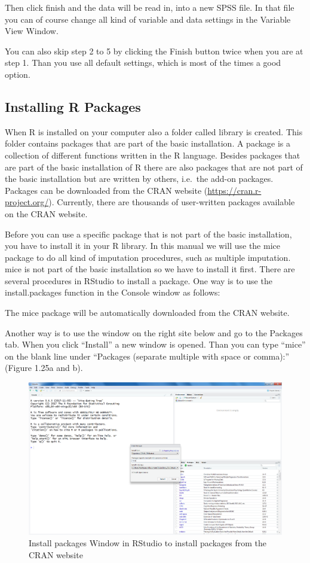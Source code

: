 \documentclass[]{book}
\begin{document}
Then click finish and the data will be read in, into a new SPSS file. In
that file you can of course change all kind of variable and data
settings in the Variable View Window.

You can also skip step 2 to 5 by clicking the Finish button twice when
you are at step 1. Than you use all default settings, which is most of
the times a good option.

\subsection{Installing R Packages}\label{installing-r-packages}

When R is installed on your computer also a folder called library is
created. This folder contains packages that are part of the basic
installation. A package is a collection of different functions written
in the R language. Besides packages that are part of the basic
installation of R there are also packages that are not part of the basic
installation but are written by others, i.e.~the add-on packages.
Packages can be downloaded from the CRAN website
(\url{https://cran.r-project.org/}). Currently, there are thousands of
user-written packages available on the CRAN website.

Before you can use a specific package that is not part of the basic
installation, you have to install it in your R library. In this manual
we will use the mice package to do all kind of imputation procedures,
such as multiple imputation. mice is not part of the basic installation
so we have to install it first. There are several procedures in RStudio
to install a package. One way is to use the install.packages function in
the Console window as follows:

The mice package will be automatically downloaded from the CRAN website.

Another way is to use the window on the right site below and go to the
Packages tab. When you click ``Install'' a new window is opened. Than
you can type ``mice'' on the blank line under ``Packages (separate
multiple with space or comma):'' (Figure 1.25a and b).

\begin{figure}

{\centering \includegraphics[width=0.9\linewidth]{images/fig1.25a} 

}

\caption{Install packages Window in RStudio to install packages from the CRAN website}\label{fig:fig25a}
\end{figure}
\end{document}
